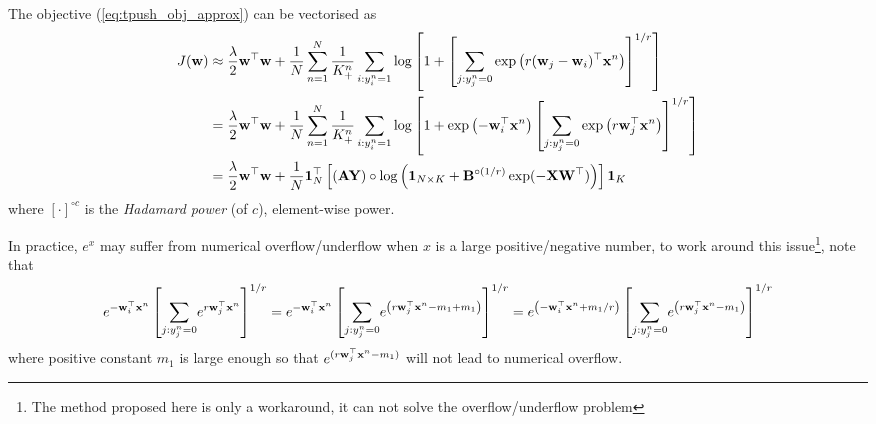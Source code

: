 The objective (\ref{eq:tpush_obj_approx}) can be vectorised as
\begin{equation}
\label{eq:tpush_obj_vec}
\begin{aligned}
J(\mathbf{w}) 
&\approx \frac{\lambda}{2} \mathbf{w}^\top \mathbf{w} + \frac{1}{N} \sum_{n=1}^N \frac{1}{K_+^n} \sum_{i:y_i^n=1}
         \log \left[ 1 + \left[ \underset{j:y_j^n=0}{\sum} \exp \left( r (\mathbf{w}_j - \mathbf{w}_i)^\top \mathbf{x}^n \right) \right]^{1/r} \right] \\
&= \frac{\lambda}{2} \mathbf{w}^\top \mathbf{w} + \frac{1}{N} \sum_{n=1}^N \frac{1}{K_+^n} \sum_{i:y_i^n=1}
   \log \left[ 1 + \exp \left( -\mathbf{w}_i^\top \mathbf{x}^n \right) \left[ \underset{j:y_j^n=0}{\sum} \exp \left( r \mathbf{w}_j^\top \mathbf{x}^n \right) \right]^{1/r} \right] \\
&= \frac{\lambda}{2} \mathbf{w}^\top \mathbf{w} + 
   \frac{1}{N} \mathbf{1}_N^\top \left[ \left( \mathbf{A} \mathbf{Y} \right) \circ \log \left( \mathbf{1}_{N \times K} + \mathbf{B}^{\circ (1/r)} \exp(-\mathbf{X} \mathbf{W}^\top ) \right) \right] \mathbf{1}_K
\end{aligned}
\end{equation}
where $[\cdot]^{\circ c}$ is the \emph{Hadamard power} (of $c$), \ie element-wise power.

In practice, $e^x$ may suffer from numerical overflow/underflow when $x$ is a large positive/negative number, to work around this issue\footnote{
The method proposed here is only a workaround, it can not solve the overflow/underflow problem}, note that
\begin{equation}
\label{eq:overflow}
e^{-\mathbf{w}_i^\top \mathbf{x}^n} \left[ \underset{j:y_j^n=0}{\sum} e^{ r \mathbf{w}_j^\top \mathbf{x}^n } \right]^{1/r} 
= e^{ -\mathbf{w}_i^\top \mathbf{x}^n } \left[ \underset{j:y_j^n=0}{\sum} e^{ \left( r \mathbf{w}_j^\top \mathbf{x}^n - m_1 + m_1 \right) } \right]^{1/r}
= e^{ \left( -\mathbf{w}_i^\top \mathbf{x}^n + m_1 / r \right) } \left[ \underset{j:y_j^n=0}{\sum} e^{ \left( r \mathbf{w}_j^\top \mathbf{x}^n - m_1 \right) } \right]^{1/r} 
\end{equation}
where positive constant $m_1$ is large enough so that $e^{(r \mathbf{w}_j^\top \mathbf{x}^n - m_1)}$ will not lead to numerical overflow.

